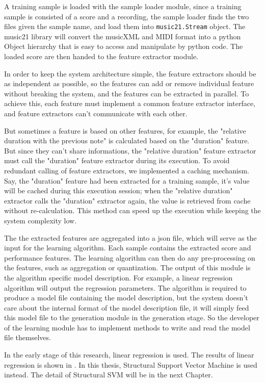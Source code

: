    A training sample is loaded with the sample loader module, since a training sample is consisted of a score and a recording, the sample loader finds the two files given the sample name, and load them into \texttt{music21.Stream} object. The music21 library will convert the musicXML and MIDI format into a python Object hierarchy that is easy to access and manipulate by python code. The loaded score are then handed to the feature extractor module.

   In  order to keep the system architecture simple, the feature extractors should be as independent as possible, so the features can add or remove individual feature without breaking the system, and the features can be extracted in parallel. To achieve this, each feature must implement a common feature extractor interface, and feature extractors can't communicate with each other. 

   But sometimes a feature is based on other features, for example, the "relative duration with the previous note" is calculated based on the "duration" feature. But since they can't share informations, the "relative duration" feature extractor must call the "duration" feature extractor during its execution. To avoid redundant calling of feature extractors, we implemented a caching mechanism. Say, the "duration" feature had been extracted for a training sample, it's value will be cached during this execution session; when the "relative duration" extractor calls the "duration" extractor again, the value is retrieved from cache without re-calculation.  This method can speed up the execution while keeping the system complexity low.

   The the extracted features are aggregated into a json file, which will serve as the input for the learning algorithm. Each sample contains the extracted score and performance features. The learning algorithm can then do any pre-processing on the features, such as aggregation or quantization. The output of this module is the algorithm specific model description. For example, a linear regression algorithm will output the regression parameters. The algorithm is required to produce a model file containing the model description, but the system doesn't care about the internal format of the model description file, it will simply feed this model file to the generation module in the generation stage. So the developer of the learning module has to implement methods to write and read the model file themselves.

   In the early stage of this research, linear regression is used. The results of linear regression is shown in \cite{Lyu2012}. In this thesis, Structural Support Vector Machine\cite{Joachims2009} is used instead. The detail of Structural SVM will be in the next Chapter.
